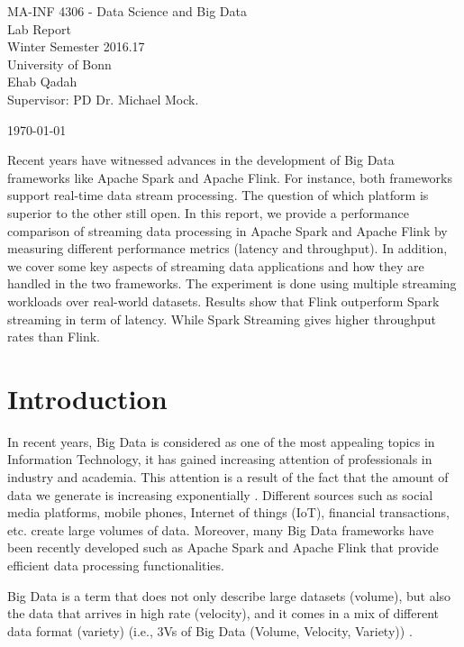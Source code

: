 \documentclass[]{article}
\begin{document}
\begin{flushleft}

\vspace{4pt}

\centering
 MA-INF 4306 - Data Science and Big Data \\
 Lab Report\\
 
   Winter Semester 2016.17\\

		 University of Bonn\\


\vspace{4pt}
\centering
 Ehab Qadah\\
 Supervisor: PD Dr. Michael Mock.
 \vspace{4pt}
 
 \today
\end{flushleft}


\begin{abstract}

\end{abstract}
Recent years have witnessed advances in the  development of Big Data frameworks like Apache Spark and Apache Flink. For instance, both frameworks support real-time data 
stream processing. The question of which platform is superior to the other still open. 
In this report, we provide a performance comparison of streaming data processing in Apache Spark and Apache Flink by measuring different performance metrics (latency and throughput). In addition, we cover some key aspects of streaming data applications and how they are handled in the two frameworks. The experiment is done using multiple streaming workloads over real-world datasets. Results show that Flink outperform Spark streaming in term of latency. While Spark Streaming gives higher throughput rates than Flink. 
\section{Introduction}

\par In recent years, Big Data is considered as one of the most appealing topics in Information Technology, it has gained increasing attention of professionals in industry and academia. This attention is a result of the fact that the amount of data we generate is increasing exponentially \cite{idc}.  Different sources such as  social media platforms, mobile phones, Internet of things (IoT), financial transactions, etc.  create large volumes of data.  Moreover, many Big Data frameworks have been recently developed such as Apache Spark and Apache Flink that provide efficient data processing functionalities.
 \par Big Data is a term that does not only describe large datasets (volume), but also the data that arrives in high rate (velocity), and it comes in a mix of different data format (variety) (i.e., 3Vs of Big Data (Volume, Velocity, Variety)) \cite{svs}.
\end{document}
